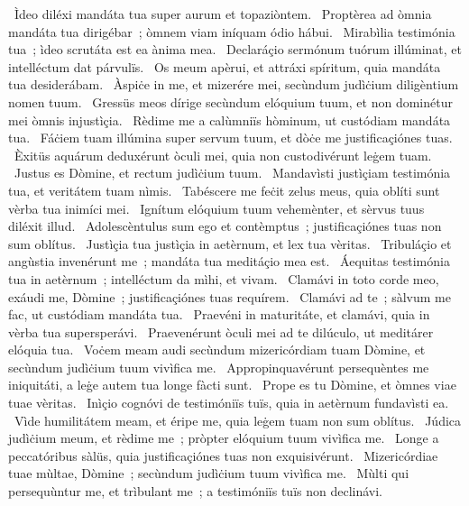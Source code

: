 {~Ìdeo diléxi mandáta tua super aurum et topaziòntem. 
~Proptèrea ad òmnia mandáta tua dirigébar~; òmnem viam iníquam ódio hábui. 
~Mirabìlia testimónia tua~; ìdeo scrutáta est ea ànima mea. 
~Declaráçio sermónum tuórum illúminat, et intelléctum dat párvulïs. 
~Os meum apèrui, et attráxi spíritum, quia mandáta tua desiderábam. 
~Àspiċe in me, et mizerére mei, secùndum judìċium diligèntium nomen tuum. 
~Gressüs meos dírige secùndum elóquium tuum, et non dominétur mei òmnis injustìçia. 
~Rèdime me a calùmniïs hòminum, ut custódiam mandáta tua. 
~Fáċiem tuam illúmina super servum tuum, et dòċe me justificaçiónes tuas. 
~Èxitüs aquárum deduxérunt òculi mei, quia non custodivérunt leġem tuam. 
~Justus es Dòmine, et rectum judìċium tuum. 
~Mandavìsti justìçiam testimónia tua, et veritátem tuam nìmis. 
~Tabéscere me feċit zelus meus, quia oblíti sunt vèrba tua inimíci mei. 
~Ignítum elóquium tuum vehemènter, et sèrvus tuus diléxit illud. 
~Adolescèntulus sum ego et contèmptus~; justificaçiónes tuas non sum oblítus. 
~Justìçia tua justìçia in aetèrnum, et lex tua vèritas. 
~Tribuláçio et angùstia invenérunt me~; mandáta tua meditáçio mea est. 
~Áequitas testimónia tua in aetèrnum~; intelléctum da mìhi, et vivam. 
~Clamávi in toto corde meo, exáudi me, Dòmine~; justificaçiónes tuas requírem. 
~Clamávi ad te~; sàlvum me fac, ut custódiam mandáta tua. 
~Praevéni in maturitáte, et clamávi, quia in vèrba tua supersperávi. 
~Praevenérunt òculi mei ad te dilúculo, ut meditárer elóquia tua. 
~Voċem meam audi secùndum mizericórdiam tuam Dòmine, et secùndum judìċium tuum vivìfica me. 
~Appropinquavérunt persequèntes me iniquitáti, a leġe autem tua longe fàcti sunt. 
~Prope es tu Dòmine, et òmnes viae tuae vèritas. 
~Inìçio cognóvi de testimóniïs tuïs, quia in aetèrnum fundavìsti ea. 
~Vìde humilitátem meam, et éripe me, quia leġem tuam non sum oblítus. 
~Júdica judìċium meum, et rèdime me~; pròpter elóquium tuum vivìfica me. 
~Longe a peccatóribus sàlüs, quia justificaçiónes tuas non exquisivérunt. 
~Mizericórdiae tuae mùltae, Dòmine~; secùndum judìċium tuum vivìfica me. 
~Mùlti qui persequùntur me, et trìbulant me~; a testimóniïs tuïs non declinávi. 
}
